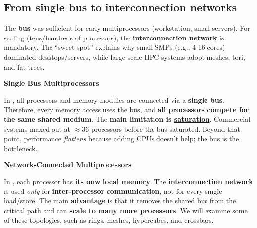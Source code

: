 \subsection{From single bus to interconnection networks}

The \textbf{bus} was sufficient for early multiprocessors (workstation, small servers). For scaling (tens/hundreds of processors), the \textbf{interconnection network} is mandatory. The ``sweet spot'' explains why small SMPs (e.g., 4-16 cores) dominated desktops/servers, while large-scale HPC systems adopt meshes, tori, and fat trees.

\highspace
\begin{flushleft}
    \textcolor{Green3}{ \textbf{Single Bus Multiprocessors}}
\end{flushleft}
In , all processors and memory modules are connected via a \textbf{single bus}. Therefore, every memory access uses the bus, and \textbf{all processors compete for the same shared medium}. The \textbf{main limitation is \underline{saturation}}. Commercial systems maxed out at $\approx 36$ processors before the bus saturated. Beyond that point, performance \emph{flattens} because adding CPUs doesn't help; the bus is the bottleneck.

\highspace
\begin{flushleft}
    \textcolor{Green3}{ \textbf{Network-Connected Multiprocessors}}
\end{flushleft}
In , each processor has \textbf{its onw local memory}. The \textbf{interconnection network} is used \emph{only} for \textbf{inter-processor communication}, not for every single load/store. The main \textbf{advantage} is that it removes the shared bus from the critical path and can \textbf{scale to many more processors}. We will examine some of these topologies, such as rings, meshes, hypercubes, and crossbars.

